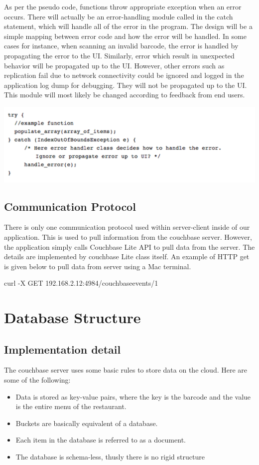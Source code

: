 \documentclass[12pt, titlepage]{article}
\begin{document}
As per the pseudo code, functions throw appropriate exception when an error occurs. There will actually be an error-handling module called in the catch statement, which will handle all of the error in the program.  The design will be a simple mapping between error code and how the error will be handled. In some cases for instance, when scanning an invalid barcode, the error is handled by propagating the error to the UI. Similarly, error which result in unexpected behavior will be propagated up to the UI. However, other errors such as replication fail due to network connectivity could be ignored and logged in the application log dump for debugging. They will not be propagated up to the UI. This module will most likely be changed according to feedback from end users.

\includegraphics[width=150mm,scale=0.5]{error.png}

\subsection{Communication Protocol}
There is only one communication protocol used within server-client inside of our application. This is used to pull information from the couchbase server. However, the application simply calls Couchbase Lite API to pull data from the server. The details are implemented by couchbase Lite class itself.  An example of HTTP get is given below to pull data from server using a Mac terminal. 

curl -X GET 192.168.2.12:4984/couchbaseevents/1

\section{Database Structure}

\subsection{Implementation detail}
The couchbase server uses some basic rules to store data on the cloud. Here are some of the following:
\begin{itemize}
  \item Data is stored as key-value pairs, where the key is the barcode and the value is the entire menu of the restaurant.
  \item Buckets are basically equivalent of a database.
  \item Each item in the database is referred to as a document.
  \item The database is schema-less, thusly there is no rigid structure
\end{itemize}
\end{document}
